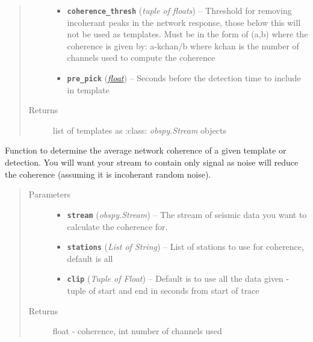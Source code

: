 \documentclass[a4paper,10pt,english]{sphinxmanual}
\begin{document}
\begin{fulllineitems}
\begin{quote}
\begin{description}
\begin{itemize}
\item {} 
\textbf{\texttt{coherence\_thresh}} (\emph{tuple of floats}) -- Threshold for removing incoherant peaks in the            network response, those below this will not be used as templates.            Must be in the form of (a,b) where the coherence is given by:            a-kchan/b where kchan is the number of channels used to compute            the coherence

\item {} 
\textbf{\texttt{pre\_pick}} (\href{https://docs.python.org/library/functions.html\#float}{\emph{float}}) -- Seconds before the detection time to include in template

\end{itemize}

\item[{Returns}] \leavevmode
list of templates as :class: \emph{obspy.Stream} objects

\end{description}\end{quote}

\end{fulllineitems}


\begin{fulllineitems}
\label{core:bright_lights.coherence}
Function to determine the average network coherence of a given template or
detection.  You will want your stream to contain only signal as noise
will reduce the coherence (assuming it is incoherant random noise).
\begin{quote}\begin{description}
\item[{Parameters}] \leavevmode\begin{itemize}
\item {} 
\textbf{\texttt{stream}} (\emph{obspy.Stream}) -- The stream of seismic data you want to calculate the            coherence for.

\item {} 
\textbf{\texttt{stations}} (\emph{List of String}) -- List of stations to use for coherence, default is all

\item {} 
\textbf{\texttt{clip}} (\emph{Tuple of Float}) -- Default is to use all the data given -             tuple of start and end in seconds from start of trace

\end{itemize}

\item[{Returns}] \leavevmode
float - coherence, int number of channels used

\end{description}\end{quote}

\end{fulllineitems}
\end{document}
